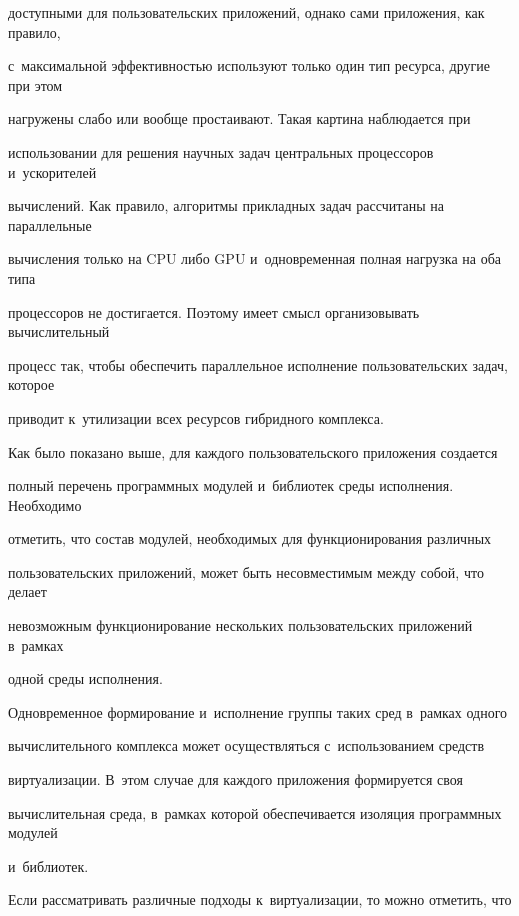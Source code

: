 доступными для пользовательских приложений, однако сами приложения, как правило, 

с~максимальной эффективностью используют только один тип ресурса, другие при этом 

нагружены слабо или вообще простаивают. Такая картина наблюдается при 

использовании для решения научных задач центральных процессоров и~ускорителей 

вычислений. Как правило, алгоритмы прикладных задач рассчитаны на параллельные 

вычисления только на CPU либо GPU и~одновременная полная нагрузка на оба типа 

процессоров не достигается. Поэтому имеет смысл организовывать вычислительный 

процесс так, чтобы обеспечить параллельное исполнение пользовательских задач, которое 

приводит к~утилизации всех ресурсов гибридного ком\-плекса.

{



}

      

      Как было показано выше, для каждого пользовательского приложения создается 

полный перечень программных модулей и~библиотек среды исполнения. Необходимо 

отметить, что состав модулей, необходимых для функционирования различных 

пользовательских приложений, может быть несовместимым между собой, что делает 

невозможным функционирование нескольких пользовательских приложений в~рамках 

одной среды исполнения.

      

      Одновременное формирование и~исполнение группы таких сред в~рамках одного 

вычислительного комплекса может осуществляться с~использованием средств

виртуализации. В~этом случае для каждого приложения формируется своя 

вычислительная среда, в~рамках которой обеспечивается изоляция программных модулей 

и~библиотек.

      

      Если рассматривать различные подходы к~виртуализации, то можно отметить, что 

